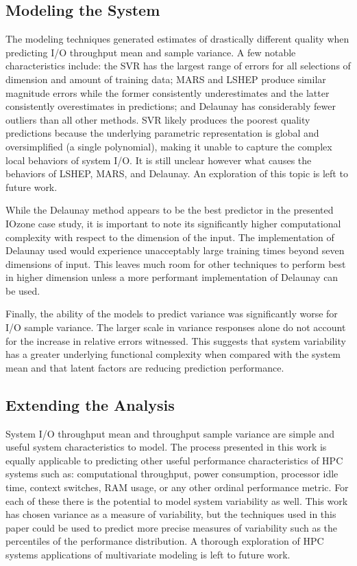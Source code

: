 \documentclass{scspaperproc}
\theoremstyle{scsthe}
\begin{document}
\subsection{Modeling the System}

The modeling techniques generated estimates of drastically different
quality when predicting I/O throughput mean and sample variance. A few
notable characteristics include: the SVR has the largest range of
errors for all selections of dimension and amount of training data;
MARS and LSHEP produce similar magnitude errors while the former
consistently underestimates and the latter consistently overestimates
in predictions; and Delaunay has considerably fewer outliers than all
other methods. SVR likely produces the poorest quality predictions
because the underlying parametric representation is global and
oversimplified (a single polynomial), making it unable to capture the
complex local behaviors of system I/O. It is still unclear however
what causes the behaviors of LSHEP, MARS, and Delaunay. An exploration
of this topic is left to future work.

While the Delaunay method appears to be the best predictor in the
presented IOzone case study, it is important to note its significantly
higher computational complexity with respect to the dimension of the
input. The implementation of Delaunay used would experience
unacceptably large training times beyond seven dimensions of
input. This leaves much room for other techniques to perform best in
higher dimension unless a more performant implementation of Delaunay
can be used.

Finally, the ability of the models to predict variance was
significantly worse for I/O sample variance. The larger scale in
variance responses alone do not account for the increase in relative
errors witnessed. This suggests that system variability has a greater
underlying functional complexity when compared with the system mean
and that latent factors are reducing prediction performance.

\subsection{Extending the Analysis}

System I/O throughput mean and throughput sample variance are simple
and useful system characteristics to model. The process presented in
this work is equally applicable to predicting other useful performance
characteristics of HPC systems such as: computational throughput,
power consumption, processor idle time, context switches, RAM usage,
or any other ordinal performance metric. For each of these there is
the potential to model system variability as well. This work has
chosen variance as a measure of variability, but the techniques used
in this paper could be used to predict more precise measures of
variability such as the percentiles of the performance distribution. A
thorough exploration of HPC systems applications of multivariate
modeling is left to future work.
\end{document}
